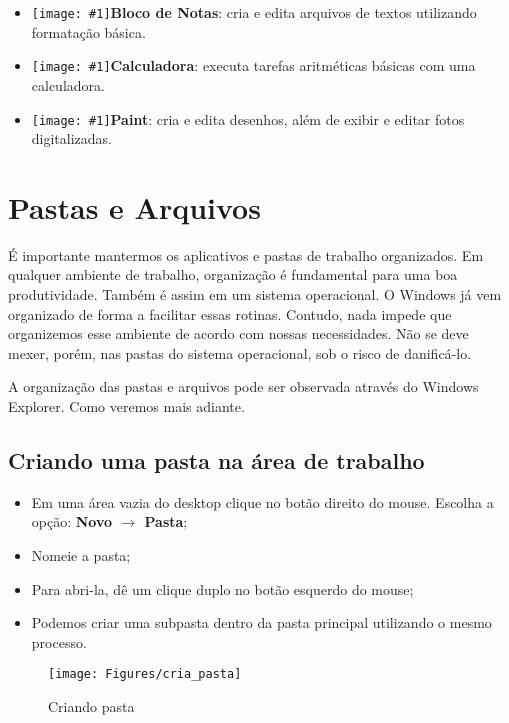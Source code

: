 \documentclass[hidelinks,12pt]{article}
\newcommand{\icon}[1]{\texttt{[image: \#1]}}
\begin{document}
\begin{itemize}
	\item{
		{\icon{Figures/bloco_notas}\bf Bloco de Notas}: cria e edita arquivos de textos utilizando formatação básica.
		
		}

	\item{
		{\icon{Figures/calculadora}\bf Calculadora}: executa tarefas aritméticas básicas com uma calculadora.
		
		}

	\item{
		{\icon{Figures/paint}\bf Paint}: cria e edita desenhos, além de exibir e editar fotos digitalizadas.
		}
\end{itemize}

\section{Pastas e Arquivos}

É importante mantermos os aplicativos e pastas de trabalho organizados. Em qualquer ambiente de trabalho, organização é fundamental para uma boa produtividade. Também é assim em um sistema operacional. O Windows já vem organizado de forma a facilitar essas rotinas. Contudo, nada impede que organizemos esse ambiente de acordo com nossas necessidades. Não se deve mexer, porém, nas pastas do sistema operacional, sob o risco de danificá-lo.

A organização das pastas e arquivos pode ser observada através do Windows Explorer. Como veremos mais adiante.

\subsection{Criando uma pasta na área de trabalho}

\begin{itemize}
	\item Em uma área vazia do desktop clique no botão direito do mouse. Escolha a opção: {\bf Novo   $\rightarrow $ Pasta};
	\item Nomeie a pasta;
	\item Para abri-la, dê um clique duplo no botão esquerdo do mouse;
	\item Podemos criar uma subpasta dentro da pasta principal utilizando o mesmo processo.
\end{itemize}

	\begin{figure}[!h]
		\centering
		\texttt{[image: Figures/cria\_pasta]}
		\caption{Criando pasta}
		\label{fig:criando pasta}
	\end{figure}
\end{document}
